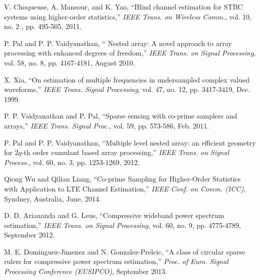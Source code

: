 \documentclass[letterpaper,10pt]{article}
\begin{document}
\begin{thebibliography}{1}
   V. Choqueuse, A. Mansour, and K. Yao, ``Blind channel estimation for STBC systems using higher-order statistics,'' \emph{IEEE Trans. on Wireless Comm.}, vol. 10, no. 2 , pp. 495-505, 2011.

   P. Pal and P. P. Vaidyanathan, `` Nested array: A novel approach to array processing with enhanced degrees of freedom,'' \emph{IEEE Trans. on Signal Processing}, vol. 58, no. 8, pp. 4167-4181, August 2010.

  X. Xia, ``On estimation of multiple frequencies in undersampled complex valued waveforms,'' \emph{IEEE Trans. Signal Processing}, vol. 47, no. 12, pp. 3417-3419, Dec. 1999.

  P. P. Vaidyanathan and P. Pal, ``Sparse sensing with co-prime samplers and arrays,'' \emph{IEEE Trans. Signal Proc.}, vol. 59, pp. 573-586, Feb. 2011.

   P. Pal and P. P. Vaidyanathan, ``Multiple level nested array: an efficient geometry for $2q$-th order cumulant based array processing,'' \emph{IEEE Trans. on Signal Process.}, vol. 60, no. 3, pp. 1253-1269, 2012.

   Qiong Wu and Qilian Liang, ``Co-prime Sampling for Higher-Order Statistics with Application to LTE Channel Estimation,'' \emph{IEEE Conf. on Comm. (ICC)}, Syndney, Australia, June, 2014.

   D. D. Ariananda and G. Leus, ``Compressive wideband power spectrum estimation,'' \emph{IEEE Trans. on Signal Processing}, vol. 60, no. 9, pp. 4775-4789, September 2012.

   M. E. Dominguez-Jimenez and N. Gonzalez-Prelcic, ``A class of circular sparse rulers for compressive power spectrum estimation,'' \emph{Proc. of Euro. Signal Processing Conference (EUSIPCO)}, September 2013.

\end{thebibliography}
\end{document}
